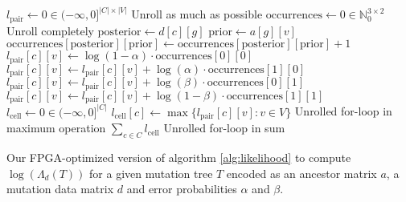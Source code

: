 \begin{algorithm}
    \begin{algorithmic}
            \State $l_\mathrm{pair} \leftarrow 0 \in (-\infty,0]^{|C| \times |V|}$
             \Comment Unroll as much as possible
                \State $\mathrm{occurrences} \leftarrow 0 \in \mathbb{N}_0^{3 \times 2}$
                 \Comment Unroll completely
                    \State $\mathrm{posterior} \leftarrow d[c][g]$
                    \State $\mathrm{prior} \leftarrow a[g][v]$
                    \State $\mathrm{occurrences}[\mathrm{posterior}][\mathrm{prior}] \leftarrow \mathrm{occurrences}[\mathrm{posterior}][\mathrm{prior}] + 1$
                \EndFor
                \State $l_\mathrm{pair}[c][v] \leftarrow \log(1-\alpha) \cdot \mathrm{occurrences}[0][0]$
                \State $l_\mathrm{pair}[c][v] \leftarrow l_\mathrm{pair}[c][v] + \log(\alpha) \cdot \mathrm{occurrences}[1][0]$
                \State $l_\mathrm{pair}[c][v] \leftarrow l_\mathrm{pair}[c][v] + \log(\beta) \cdot \mathrm{occurrences}[0][1]$
                \State $l_\mathrm{pair}[c][v] \leftarrow l_\mathrm{pair}[c][v] + \log(1-\beta) \cdot \mathrm{occurrences}[1][1]$
            \EndFor
            \State $l_\mathrm{cell} \leftarrow 0 \in (-\infty,0]^{|C|}$
                \State $l_\mathrm{cell}[c] \leftarrow \max \{l_\mathrm{pair}[c][v] : v \in V\}$ \Comment Unrolled for-loop in maximum operation
            \EndFor
            \State \Return $\sum_{c \in C} l_\mathrm{cell}$ \Comment Unrolled for-loop in sum
        \EndFunction
    \end{algorithmic}
    \caption{Our \ac{FPGA}-optimized version of algorithm \ref{alg:likelihood} to compute $\log(\Lambda_d(T))$ for a given mutation tree $T$ encoded as an ancestor matrix $a$, a mutation data matrix $d$ and error probabilities $\alpha$ and $\beta$.}
    \label{alg:likelihoodimpl}
\end{algorithm}